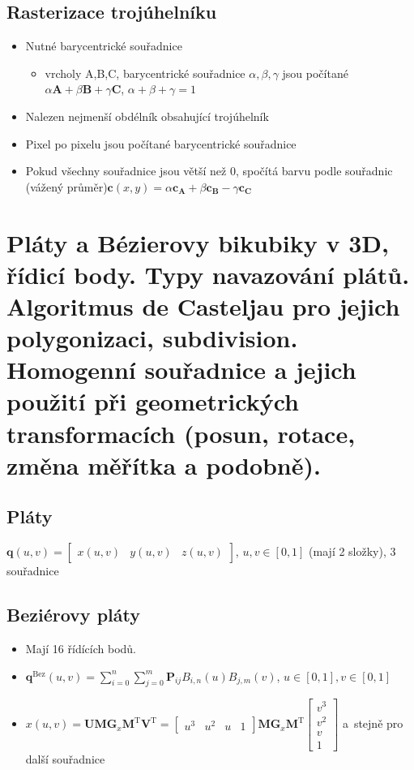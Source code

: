 \subsection{Rasterizace trojúhelníku}
\begin{itemize}
    \item Nutné barycentrické souřadnice
    \begin{itemize}
        \item vrcholy A,B,C, barycentrické souřadnice \(\alpha, \beta, \gamma\) jsou počítané \(\alpha\mathbf{A}+\beta\mathbf{B}+\gamma\mathbf{C}\), \(\alpha+\beta+\gamma=1\)
    \end{itemize}
    \item Nalezen nejmenší obdélník obsahující trojúhelník
    \item Pixel po pixelu jsou počítané barycentrické souřadnice
    \item Pokud všechny souřadnice jsou větší než 0, spočítá barvu podle souřadnic (vážený průměr)\(\mathbf{c}(x,y)=\alpha\mathbf{c_A}+\beta\mathbf{c_B}-\gamma\mathbf{c_C}\)
\end{itemize}

\section{Pláty a Bézierovy bikubiky v 3D, řídicí body. Typy navazování plátů. Algoritmus de Casteljau pro jejich polygonizaci, subdivision. Homogenní souřadnice a jejich použití při geometrických transformacích (posun, rotace, změna měřítka a podobně).}
\subsection{Pláty}
\(\mathbf{q}(u,v)=\begin{bmatrix}
    x(u,v) & y(u,v) & z(u,v)
\end{bmatrix}\), \(u,v\in[0,1]\) (mají 2  složky), 3 souřadnice

\subsection{Beziérovy pláty}
\begin{itemize}
    \item Mají 16 řídících bodů.
    \item \(\mathbf{q}^\mathrm{Bez}(u,v)=\sum^n_{i=0}\sum^m_{j=0}\mathbf{P}_{ij}B_{i,n}(u)B_{j,m}(v)\), \(u\in [0,1], v\in [0,1]\)
    \item \(x(u,v)=\mathbf{UMG}_x\mathbf{M}^\mathrm{T}\mathbf{V}^\mathrm{T}=\begin{bmatrix}
        u^3&u^2&u&1
    \end{bmatrix}\mathbf{MG}_x\mathbf{M}^\mathrm{T}\begin{bmatrix}
        v^3 \\ v^2 \\ v \\ 1
    \end{bmatrix}\) a~stejně pro další souřadnice
\end{itemize}

